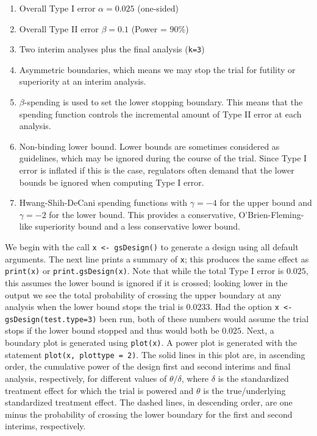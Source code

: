 \begin{enumerate}
\item Overall Type I error $\alpha = 0.025$ (one-sided)

\item Overall Type II error $\beta = 0.1$ (Power = $90\%$)

\item Two interim analyses plus the final analysis (\texttt{k=3})

\item Asymmetric boundaries, which means we may stop the trial for futility or
superiority at an interim analysis.

\item $\beta$-spending is used to set the lower stopping
boundary. This means that the spending function controls the incremental
amount of Type II error at each analysis.

\item Non-binding lower bound. Lower bounds are sometimes considered as
guidelines, which may be ignored during the course of the trial. Since Type I
error is inflated if this is the case, regulators often demand that the lower
bounds be ignored when computing Type I error.

\item Hwang-Shih-DeCani spending functions with $\gamma = -4$ for the upper
bound and $\gamma = -2$ for the lower bound. This provides a conservative,
O'Brien-Fleming-like superiority bound and a less conservative lower bound.
\end{enumerate}

We begin with the call 
\verb!x <- gsDesign()!
to generate a design using all default arguments. The next line
prints a summary of \texttt{x}; this produces the same effect as
\texttt{print(x)} or \texttt{print.gsDesign(x)}. Note that while the total
Type I error is $0.025$, this assumes the lower bound is ignored if it is
crossed; looking lower in the output we see the total probability of crossing
the upper boundary at any analysis when the lower bound stops the trial is
$0.0233$. Had the option 
\verb!x <- gsDesign(test.type=3)!
been run, both of these numbers would assume the trial
stops if the lower bound stopped and thus would both be $0.025$. Next, a
boundary plot is generated using \texttt{plot(x)}. A power plot is generated
with the statement \texttt{plot(x, plottype = 2)}. The solid lines in this plot
are, in ascending order, the cumulative power of the design first and second
interims and final analysis, respectively, for different values of
$\theta/\delta$, where $\delta$ is the standardized treatment effect for which
the trial is powered and $\theta$ is the true/underlying standardized
treatment effect. The dashed lines, in descending order, are one minus the
probability of crossing the lower boundary for the first and second interims, respectively.

